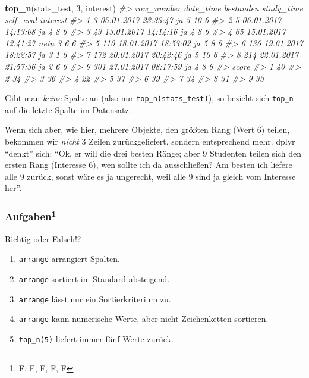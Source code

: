 \documentclass[12pt,ngerman,]{book}
\makeatletter
\newenvironment{Shaded}{\begin{snugshade}}{\end{snugshade}}
\newcommand{\KeywordTok}[1]{\textcolor[rgb]{0.13,0.29,0.53}{\textbf{{#1}}}}
\newcommand{\DecValTok}[1]{\textcolor[rgb]{0.00,0.00,0.81}{{#1}}}
\newcommand{\CommentTok}[1]{\textcolor[rgb]{0.56,0.35,0.01}{\textit{{#1}}}}
\newcommand{\NormalTok}[1]{{#1}}
\providecommand{\tightlist}{%
  \setlength{\itemsep}{0pt}\setlength{\parskip}{0pt}}
\let\rmarkdownfootnote\footnote%
\def\footnote{\protect\rmarkdownfootnote}
\newenvironment{kframe}{%
\medskip{}
\setlength{\fboxsep}{.8em}
 \def\at@end@of@kframe{}%
 \ifinner\ifhmode%
  \def\at@end@of@kframe{\end{minipage}}%
  \begin{minipage}{\columnwidth}%
 \fi\fi%
 \def\FrameCommand##1{\hskip\@totalleftmargin \hskip-\fboxsep
 \colorbox{shadecolor}{##1}\hskip-\fboxsep
     \hskip-\linewidth \hskip-\@totalleftmargin \hskip\columnwidth}%
 \MakeFramed {\advance\hsize-\width
   \@totalleftmargin\z@ \linewidth\hsize
   \@setminipage}}%
 {\par\unskip\endMakeFramed%
 \at@end@of@kframe}
\renewenvironment{Shaded}{\begin{kframe}}{\end{kframe}}
\theoremstyle{definition}
\theoremstyle{definition}
\theoremstyle{remark}
\let\BeginKnitrBlock\begin \let\EndKnitrBlock\end
\makeatother
\begin{document}
\begin{Shaded}
\begin{Highlighting}[]


\KeywordTok{top_n}\NormalTok{(stats_test, }\DecValTok{3}\NormalTok{, interest)}
\CommentTok{#>   row_number           date_time bestanden study_time self_eval interest}
\CommentTok{#> 1          3 05.01.2017 23:33:47        ja          5        10        6}
\CommentTok{#> 2          5 06.01.2017 14:13:08        ja          4         8        6}
\CommentTok{#> 3         43 13.01.2017 14:14:16        ja          4         8        6}
\CommentTok{#> 4         65 15.01.2017 12:41:27      nein          3         6        6}
\CommentTok{#> 5        110 18.01.2017 18:53:02        ja          5         8        6}
\CommentTok{#> 6        136 19.01.2017 18:22:57        ja          3         1        6}
\CommentTok{#> 7        172 20.01.2017 20:42:46        ja          5        10        6}
\CommentTok{#> 8        214 22.01.2017 21:57:36        ja          2         6        6}
\CommentTok{#> 9        301 27.01.2017 08:17:59        ja          4         8        6}
\CommentTok{#>   score}
\CommentTok{#> 1    40}
\CommentTok{#> 2    34}
\CommentTok{#> 3    36}
\CommentTok{#> 4    22}
\CommentTok{#> 5    37}
\CommentTok{#> 6    39}
\CommentTok{#> 7    34}
\CommentTok{#> 8    31}
\CommentTok{#> 9    33}
\end{Highlighting}
\end{Shaded}

Gibt man \emph{keine} Spalte an (also nur \texttt{top\_n(stats\_test)}),
so bezieht sich \texttt{top\_n} auf die letzte Spalte im Datensatz.

Wenn sich aber, wie hier, mehrere Objekte, den größten Rang (Wert 6)
teilen, bekommen wir \emph{nicht} 3 Zeilen zurückgeliefert, sondern
entsprechend mehr. dplyr ``denkt'' sich: ``Ok, er will die drei besten
Ränge; aber 9 Studenten teilen sich den ersten Rang (Interesse 6), wen
sollte ich da ausschließen? Am besten ich liefere alle 9 zurück, sonst
wäre es ja ungerecht, weil alle 9 sind ja gleich vom Interesse her''.

\subsubsection[Aufgaben]{\texorpdfstring{Aufgaben\footnote{F, F, F, F, F}}{Aufgaben}}\label{aufgaben-4}

\BeginKnitrBlock{rmdexercises}
Richtig oder Falsch!?

\begin{enumerate}
\def\labelenumi{\arabic{enumi}.}
\tightlist
\item
  \texttt{arrange} arrangiert Spalten.
\item
  \texttt{arrange} sortiert im Standard absteigend.
\item
  \texttt{arrange} lässt nur ein Sortierkriterium zu.
\item
  \texttt{arrange} kann numerische Werte, aber nicht Zeichenketten
  sortieren.
\item
  \texttt{top\_n(5)} liefert immer fünf Werte zurück.
\end{enumerate}
\EndKnitrBlock{rmdexercises}
\end{document}
